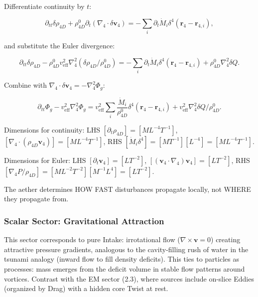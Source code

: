 Differentiate continuity by $t$:

\begin{equation}
\partial_{tt} \delta \rho_{4D} + \rho_{4D}^0 \partial_t (\nabla_4 \cdot \delta \mathbf{v}_4) = -\sum_i \partial_t \dot{M}_i \delta^4(\mathbf{r}_4 - \mathbf{r}_{4,i}),
\end{equation}

and substitute the Euler divergence:

\begin{equation}
\partial_{tt} \delta \rho_{4D} - \rho_{4D}^0 v_{\text{eff}}^2 \nabla_4^2 (\delta \rho_{4D} / \rho_{4D}^0) = -\sum_i \partial_t \dot{M}_i \delta^4(\mathbf{r}_4 - \mathbf{r}_{4,i}) + \rho_{4D}^0 \nabla_4^2 \delta Q.
\end{equation}

Combine with $\nabla_4 \cdot \delta \mathbf{v}_4 = -\nabla_4^2 \Phi_g$:

\begin{equation}
\partial_{tt} \Phi_g - v_{\text{eff}}^2 \nabla_4^2 \Phi_g = v_{\text{eff}}^2 \sum_i \frac{\dot{M}_i}{\rho_{4D}^0} \delta^4(\mathbf{r}_4 - \mathbf{r}_{4,i}) + v_{\text{eff}}^2 \nabla_4^2 \delta Q / \rho_{4D}^0.
\end{equation}

\begin{tcolorbox}[title=Dimensional Checks]
Dimensions for continuity: LHS $[\partial_t \rho_{4D}] = [M L^{-4} T^{-1}]$, $[\nabla_4 \cdot (\rho_{4D} \mathbf{v}_4)] = [M L^{-4} T^{-1}]$, RHS $[\dot{M}_i \delta^4] = [M T^{-1}] [L^{-4}] = [M L^{-4} T^{-1}]$.

Dimensions for Euler: LHS $[\partial_t \mathbf{v}_4] = [L T^{-2}]$, $[(\mathbf{v}_4 \cdot \nabla_4) \mathbf{v}_4] = [L T^{-2}]$, RHS $[\nabla_4 P / \rho_{4D}] = [M L^{-2} T^{-2}] [M^{-1} L^{4}] = [L T^{-2}]$.
\end{tcolorbox}

\begin{tcolorbox}
The aether determines HOW FAST disturbances propagate locally, not WHERE they propagate from.
\end{tcolorbox}

\subsubsection{Scalar Sector: Gravitational Attraction}

This sector corresponds to pure Intake: irrotational flow ($\nabla \times \mathbf{v} = 0$) creating attractive pressure gradients, analogous to the cavity-filling rush of water in the tsunami analogy (inward flow to fill density deficits). This ties to particles as processes: mass emerges from the deficit volume in stable flow patterns around vortices. Contrast with the EM sector (2.3), where sources include on-slice Eddies (organized by Drag) with a hidden core Twist at rest.

